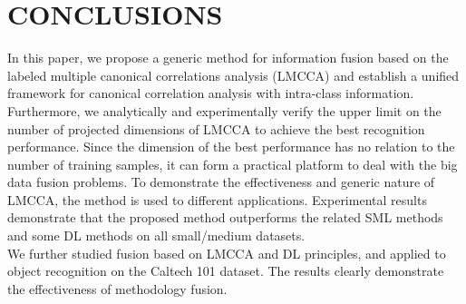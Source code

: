 \documentclass[journal]{IEEEtran}
\begin{document}
\section{CONCLUSIONS}
In this paper, we propose a generic method for information fusion based on the labeled multiple canonical correlations analysis (LMCCA) and establish a unified framework for canonical correlation analysis with intra-class information. Furthermore, we analytically and experimentally verify the upper limit on the number of projected dimensions of LMCCA to achieve the best recognition performance. Since the dimension of the best performance has no relation to the number of training samples, it can form a practical platform to deal with the big data fusion problems. To demonstrate the effectiveness and generic nature of LMCCA, the method is used to different applications. Experimental results demonstrate that the proposed method outperforms the related SML methods and some DL methods on all small/medium datasets. \\\indent We further studied fusion based on LMCCA and DL principles, and applied to object recognition on the Caltech 101 dataset. The results clearly demonstrate the effectiveness of methodology fusion.
%
%

\end{document}
